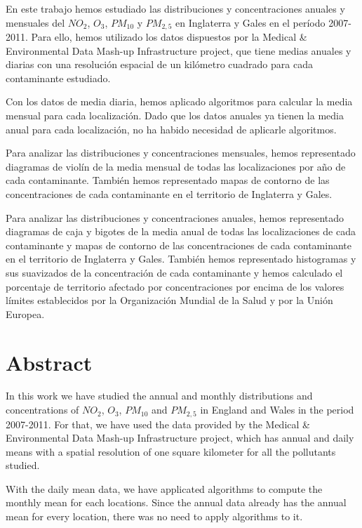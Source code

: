 \documentclass[12pt]{article}
\begin{document}
\normalsize En este trabajo hemos estudiado las distribuciones y concentraciones anuales y mensuales del $NO_{2}$, $O_{3}$, $PM_{10}$ y $PM_{2,5}$ en Inglaterra y Gales en el período 2007-2011. Para ello, hemos utilizado los datos dispuestos por la Medical \& Environmental Data Mash-up Infrastructure project, que tiene medias anuales y diarias con una resolución espacial de un kilómetro cuadrado para cada contaminante estudiado.

Con los datos de media diaria, hemos aplicado algoritmos para calcular la media mensual para cada localización. Dado que los datos anuales ya tienen la media anual para cada localización, no ha habido necesidad de aplicarle algoritmos.

Para analizar las distribuciones y concentraciones mensuales, hemos representado diagramas de violín de la media mensual de todas las localizaciones por año de cada contaminante. También hemos representado mapas de contorno de las concentraciones de cada contaminante en el territorio de Inglaterra y Gales.

Para analizar las distribuciones y concentraciones anuales, hemos representado diagramas de caja y bigotes de la media anual de todas las localizaciones de cada contaminante y mapas de contorno de las concentraciones de cada contaminante en el territorio de Inglaterra y Gales. También hemos representado histogramas y sus suavizados de la concentración de cada contaminante y hemos calculado el porcentaje de territorio afectado por concentraciones por encima de los valores límites establecidos por la Organización Mundial de la Salud y por la Unión Europea.

\vspace{0.5cm}

\section*{Abstract}

In this work we have studied the annual and monthly distributions and concentrations of $NO_{2}$, $O_{3}$, $PM_{10}$ and $PM_{2,5}$ in England and Wales in the period 2007-2011. For that, we have used the data provided by the Medical \& Environmental Data Mash-up Infrastructure project, which has annual and daily means with a spatial resolution of one square kilometer for all the pollutants studied.

With the daily mean data, we have applicated algorithms to compute the monthly mean for each locations. Since the annual data already has the annual mean for every location, there was no need to apply algorithms to it.
\end{document}
